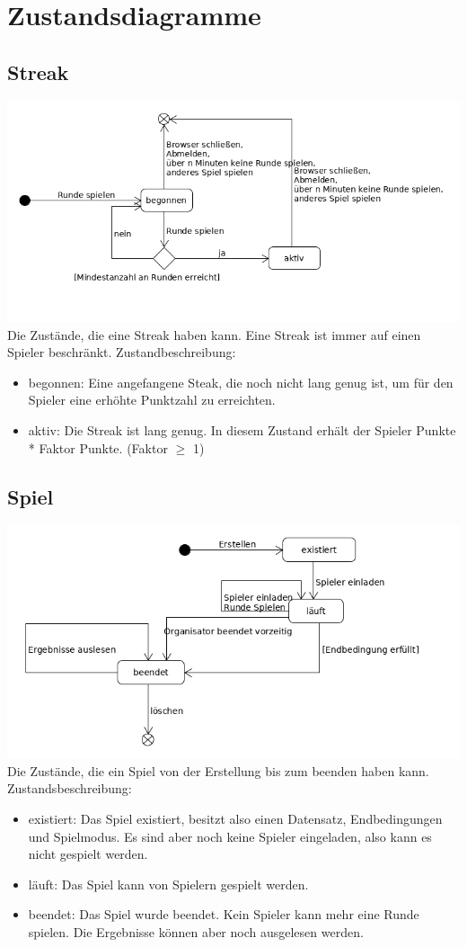 \documentclass[a4paper]{scrreprt}
\begin{document}
    \section{Zustandsdiagramme}
    \subsection{Streak}
    \label{fig:Streak_State}
    \includegraphics[width=\textwidth]{uml/export/Streak_Zustand.png}
    Die Zustände, die eine Streak haben kann. Eine Streak ist immer auf einen Spieler beschränkt.
    Zustandbeschreibung:
    \begin{itemize}
    \item begonnen: Eine angefangene Steak, die noch nicht lang genug ist, um für den Spieler eine erhöhte Punktzahl zu erreichten.
    \item aktiv: Die Streak ist lang genug. In diesem Zustand erhält der Spieler Punkte * Faktor Punkte. (Faktor $\geq$ 1)
    \end{itemize}
    \subsection{Spiel}
    \label{fig:Spiel_State}
    \includegraphics[width=\textwidth]{uml/export/Spiel_Zustand.png}
    Die Zustände, die ein Spiel von der Erstellung bis zum beenden haben kann.
    Zustandsbeschreibung:
    \begin{itemize}
    \item existiert: Das Spiel existiert, besitzt also einen Datensatz, Endbedingungen und Spielmodus. Es sind aber noch keine Spieler eingeladen, also kann es nicht gespielt werden.
    \item läuft: Das Spiel kann von Spielern gespielt werden.
    \item beendet: Das Spiel wurde beendet. Kein Spieler kann mehr eine Runde spielen. Die Ergebnisse können aber noch ausgelesen werden. 
    \end{itemize}
\end{document}
